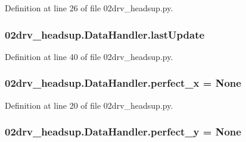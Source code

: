 Definition at line 26 of file 02drv\+\_\+headsup.\+py.

\subsubsection[{\texorpdfstring{last\+Update}{lastUpdate}}]{\setlength{\rightskip}{0pt plus 5cm}02drv\+\_\+headsup.\+Data\+Handler.\+last\+Update}\hypertarget{class02drv__headsup_1_1_data_handler_aa5e27af3cfc7e5968bed37c476d8ca23}{}\label{class02drv__headsup_1_1_data_handler_aa5e27af3cfc7e5968bed37c476d8ca23}


Definition at line 40 of file 02drv\+\_\+headsup.\+py.

\subsubsection[{\texorpdfstring{perfect\+\_\+x}{perfect_x}}]{\setlength{\rightskip}{0pt plus 5cm}02drv\+\_\+headsup.\+Data\+Handler.\+perfect\+\_\+x = None\hspace{0.3cm}{\ttfamily [static]}}\hypertarget{class02drv__headsup_1_1_data_handler_a6abca36c6b02c13ff6fb71315182eb8b}{}\label{class02drv__headsup_1_1_data_handler_a6abca36c6b02c13ff6fb71315182eb8b}


Definition at line 20 of file 02drv\+\_\+headsup.\+py.

\subsubsection[{\texorpdfstring{perfect\+\_\+y}{perfect_y}}]{\setlength{\rightskip}{0pt plus 5cm}02drv\+\_\+headsup.\+Data\+Handler.\+perfect\+\_\+y = None\hspace{0.3cm}{\ttfamily [static]}}\hypertarget{class02drv__headsup_1_1_data_handler_a8ae8c0bff76bc30d236ecfea5cec7ed2}{}\label{class02drv__headsup_1_1_data_handler_a8ae8c0bff76bc30d236ecfea5cec7ed2}


